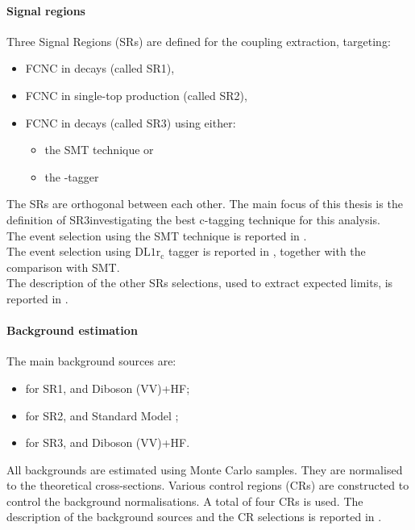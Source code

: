 \paragraph{Signal regions}
Three Signal Regions (SRs) are defined for the \tZc coupling extraction, targeting:
\begin{itemize}
	\item FCNC \tZc in \ttbar decays (called SR1\tZc), 
	\item FCNC \tZc in single-top production (called SR2\tZc), 
	\item FCNC \tZc in \ttbar decays (called SR3\tZc) using either:
	\begin{itemize}
		\item the SMT technique or
		\item the \Pqc-tagger \DLrc
	\end{itemize}
\end{itemize}
The SRs are orthogonal between each other. 
The main focus of this thesis is the definition of SR3\tZc investigating the best c-tagging technique for this analysis.\\
The event selection using the SMT technique is reported in .\\
The event selection using $\mathrm{DL1r_{c}}$ tagger is reported in , together with the comparison with SMT.\\
The description of the other SRs selections, used to extract expected limits, is reported in .\\

\paragraph{Background estimation}
The main background sources are:
\begin{itemize}
	\item for SR1\tZc, \ttZ and Diboson (VV)+HF;
	\item for SR2\tZc, \VVHF and Standard Model \tZq ;
	\item for SR3\tZc, \ttZ and Diboson (VV)+HF.
\end{itemize}

\noindent All backgrounds are estimated using Monte Carlo samples. They are
normalised to the theoretical cross-sections. 
Various control regions (CRs) are constructed to control the
background normalisations. A total of four CRs is used. 
The description of the background sources and the CR selections is
reported in .


